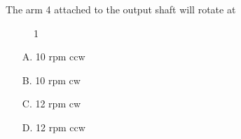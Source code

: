 \documentclass[journal]{IEEEtran}
\begin{document}
\begin{enumerate}
The arm 4 attached to the output shaft will rotate at 

\begin{figure}[!ht]
    \centering
    \caption{ 1}
    \label{fig:shaft}
    \end{figure}

\begin{enumerate}
    \item [A.] 10 rpm ccw
    \item [B.] 10 rpm cw
    \item [C.] 12 rpm cw
    \item [D.] 12 rpm ccw
  \end{enumerate}




















  
\end{enumerate}




\end{document}
